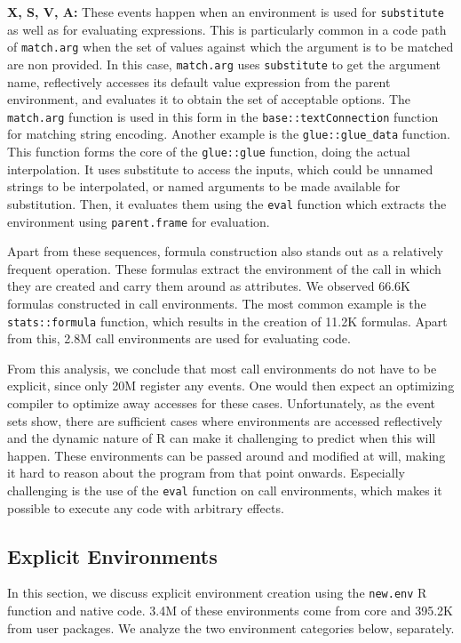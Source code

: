 \documentclass[10pt,review,sigplan,authorversion=true]{acmart}
\newcommand{\code}[1]{\lstinline |#1|\xspace}
\newcommand{\newEnv}{\code{new.env}}
\newcommand{\substitute}{\code{substitute}}
\begin{document}
\noindent
\textbf{X, S, V, A:} These events happen when an environment is used for
  \substitute as well as for evaluating expressions. This is particularly common
  in a code path of \code{match.arg} when the set of values against which the
  argument is to be matched are non provided. In this case, \code{match.arg}
  uses \code{substitute} to get the argument name, reflectively accesses its
  default value expression from the parent environment, and evaluates it to
  obtain the set of acceptable options. The \code{match.arg} function is used in
  this form in the \code{base::textConnection} function for matching string
  encoding. Another example is the \code{glue::glue_data} function. This
  function forms the core of the \code{glue::glue} function, doing the actual
  interpolation. It uses substitute to access the inputs, which could be unnamed
  strings to be interpolated, or named arguments to be made available for
  substitution. Then, it evaluates them using the \code{eval} function which
  extracts the environment using \code{parent.frame} for evaluation.


Apart from these sequences, formula construction also stands out as a relatively
frequent operation. These formulas extract the environment of the call in which
they are created and carry them around as attributes. We observed 66.6K formulas
constructed in call environments. The most common example is the
\code{stats::formula} function, which results in the creation of 11.2K formulas.
Apart from this, 2.8M call environments are used for evaluating code.


From this analysis, we conclude that most call environments do not have to be
explicit, since only 20M register any events. One would then expect an
optimizing compiler to optimize away accesses for these cases. Unfortunately, as
the event sets show, there are sufficient cases where environments are accessed
reflectively and the dynamic nature of R can make it challenging to predict when
this will happen. These environments can be passed around and modified at will,
making it hard to reason about the program from that point onwards. Especially
challenging is the use of the \code{eval} function on call environments, which
makes it possible to execute any code with arbitrary effects.

\subsection{Explicit Environments}
In this section, we discuss explicit environment creation using the \newEnv R
function and native code. 3.4M of these environments come from core and 395.2K
from user packages. We analyze the two environment categories below, separately.
\end{document}
